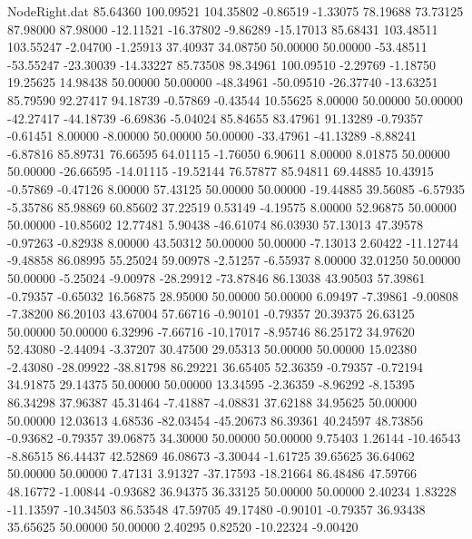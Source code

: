 \begin{filecontents}{NodeRight.dat}
  85.64360  100.09521  104.35802    -0.86519   -1.33075   78.19688   73.73125   87.98000   87.98000  -12.11521  -16.37802   -9.86289  -15.17013
  85.68431  103.48511  103.55247    -2.04700   -1.25913   37.40937   34.08750   50.00000   50.00000  -53.48511  -53.55247  -23.30039  -14.33227
  85.73508   98.34961  100.09510    -2.29769   -1.18750   19.25625   14.98438   50.00000   50.00000  -48.34961  -50.09510  -26.37740  -13.63251
  85.79590   92.27417   94.18739    -0.57869   -0.43544   10.55625    8.00000   50.00000   50.00000  -42.27417  -44.18739   -6.69836   -5.04024
  85.84655   83.47961   91.13289    -0.79357   -0.61451    8.00000   -8.00000   50.00000   50.00000  -33.47961  -41.13289   -8.88241   -6.87816
  85.89731   76.66595   64.01115    -1.76050    6.90611    8.00000    8.01875   50.00000   50.00000  -26.66595  -14.01115  -19.52144   76.57877
  85.94811   69.44885   10.43915    -0.57869   -0.47126    8.00000   57.43125   50.00000   50.00000  -19.44885   39.56085   -6.57935   -5.35786
  85.98869   60.85602   37.22519     0.53149   -4.19575    8.00000   52.96875   50.00000   50.00000  -10.85602   12.77481    5.90438  -46.61074
  86.03930   57.13013   47.39578    -0.97263   -0.82938    8.00000   43.50312   50.00000   50.00000   -7.13013    2.60422  -11.12744   -9.48858
  86.08995   55.25024   59.00978    -2.51257   -6.55937    8.00000   32.01250   50.00000   50.00000   -5.25024   -9.00978  -28.29912  -73.87846
  86.13038   43.90503   57.39861    -0.79357   -0.65032   16.56875   28.95000   50.00000   50.00000    6.09497   -7.39861   -9.00808   -7.38200
  86.20103   43.67004   57.66716    -0.90101   -0.79357   20.39375   26.63125   50.00000   50.00000    6.32996   -7.66716  -10.17017   -8.95746
  86.25172   34.97620   52.43080    -2.44094   -3.37207   30.47500   29.05313   50.00000   50.00000   15.02380   -2.43080  -28.09922  -38.81798
  86.29221   36.65405   52.36359    -0.79357   -0.72194   34.91875   29.14375   50.00000   50.00000   13.34595   -2.36359   -8.96292   -8.15395
  86.34298   37.96387   45.31464    -7.41887   -4.08831   37.62188   34.95625   50.00000   50.00000   12.03613    4.68536  -82.03454  -45.20673
  86.39361   40.24597   48.73856    -0.93682   -0.79357   39.06875   34.30000   50.00000   50.00000    9.75403    1.26144  -10.46543   -8.86515
  86.44437   42.52869   46.08673    -3.30044   -1.61725   39.65625   36.64062   50.00000   50.00000    7.47131    3.91327  -37.17593  -18.21664
  86.48486   47.59766   48.16772    -1.00844   -0.93682   36.94375   36.33125   50.00000   50.00000    2.40234    1.83228  -11.13597  -10.34503
  86.53548   47.59705   49.17480    -0.90101   -0.79357   36.93438   35.65625   50.00000   50.00000    2.40295    0.82520  -10.22324   -9.00420

\end{filecontents}
